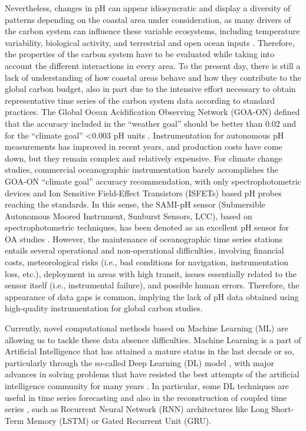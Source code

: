 Nevertheless, changes in pH can appear idiosyncratic and display a
diversity of patterns depending on the coastal area under consideration, as
many drivers of the carbon system can influence these variable ecosystems,
including temperature variability, biological activity, and terrestrial and
open ocean inputs \cite{Carstensen2019}. Therefore, the properties of the
carbon system have to be evaluated while taking into account the different
interactions in every area. To the present day, there is still a lack of
understanding of how coastal areas behave and how they contribute to the global
carbon budget, also in part due to the intensive effort necessary to obtain
representative time series of the carbon system data according to standard
practices. The Global Ocean Acidification Observing Network (GOA-ON) defined
that the accuracy included in the “weather goal” should be better than 0.02 and
for the “climate goal” <0.003 pH units \cite{newton2015}. Instrumentation for
autonomous pH measurements has improved in recent years, and production costs
have come down, but they remain complex and relatively expensive. For climate
change studies, commercial oceanographic instrumentation barely accomplishes
the GOA-ON “climate goal” accuracy recommendation, with only spectrophotometric
devices and Ion Sensitive Field-Effect Transistors (ISFETs) based pH probes
reaching the standards. In this sense, the SAMI-pH sensor (Submersible
Autonomous Moored Instrument, Sunburst Sensors, LCC), based on
spectrophotometric techniques, has been denoted as an excellent pH sensor for
OA studies \cite{Flecha2015}. However, the maintenance of oceanographic time
series stations entails several operational and non-operational difficulties,
involving financial costs, meteorological risks (i.e., bad conditions for
navigation, instrumentation loss, etc.), deployment in areas with high transit,
issues essentially related to the sensor itself (i.e., instrumental failure),
and possible human errors. Therefore, the appearance of data gaps is common,
implying the lack of pH data obtained using high-quality instrumentation for
global carbon studies.

Currently, novel computational methods based on Machine Learning (ML) are
allowing us to tackle these data absence difficulties. Machine Learning is a
part
of Artificial Intelligence that has attained a mature status in the last decade
or so, particularly through the so-called Deep Learning (DL) model
\cite{Goodfellow2016}, with major advances in solving problems that have
resisted the best attempts of the artificial intelligence community for many
years \cite{LeCun2015}. In particular, some DL techniques are useful in time
series forecasting \cite{Hewamalage2021} and also in the reconstruction of
coupled time series \cite{Huang2020}, such as Recurrent Neural Network (RNN)
architectures like Long Short-Term Memory (LSTM) \cite{LSTM_NN} or Gated
Recurrent Unit (GRU).

